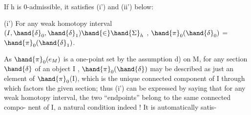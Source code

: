 If h is 0-admissible,  it satisfies  (i') and (ii') below:

(i')  For any weak homotopy interval $(I,\hand{\delta}_0,\hand{\delta}_1)\hand{\in}\hand{\Sigma}_h$ , $\hand{\pi}_0(\hand{\delta}_0)$ = $\hand{\pi}_0(\hand{\delta}_1)$.

As $\hand{\pi}_0(e_M)$  is a one-point set by the assumption d) on M,  for any section
$\hand{\delta}$ of an object I , $\hand{\pi}_0(\hand{\delta})$ may be described as just an element of $\hand{\pi}_0$(I),
which is the unique connected component of I through which factors the
given section;  thus (i') can be expressed by saying that for any weak
homotopy interval, the two ``endpoints'' belong to the same connected compo-%
nent of I,  a natural condition indeed !  It is automatically satis-%

